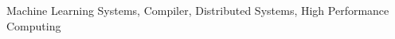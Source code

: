 \documentclass[11pt, a4paper]{awesome-cv}
\begin{document}
\makecvheader






\small{Machine Learning Systems, Compiler, Distributed Systems, High Performance Computing}








%
%
%
%
%

\end{document}
